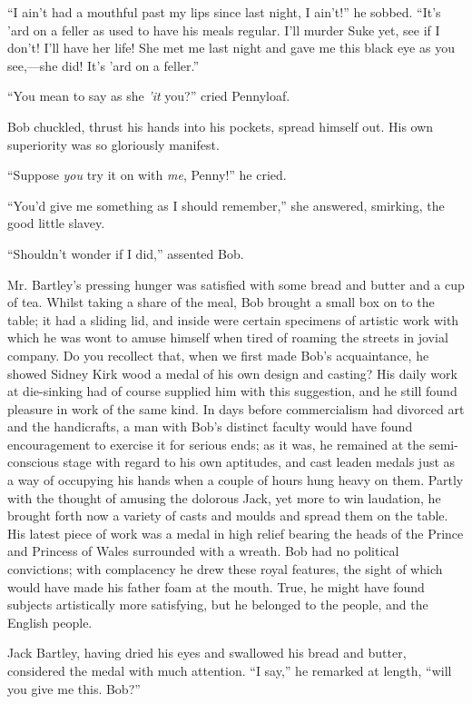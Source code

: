 ``I ain't had a mouthful past my lips since last night, I ain't!'' he
sobbed. ``It's 'ard on a feller as used to have his meals regular. I'll
murder Suke yet, see if I don't! I'll have her life! She met me last
night and gave me this black eye as you see,---she did! It's 'ard on a
feller.''

``You mean to say as she \emph{'it} you?'' cried Pennyloaf.

Bob chuckled, thrust his hands into his pockets, spread himself out. His
own superiority was so gloriously manifest.

``Suppose \emph{you} try it on with \emph{me}, Penny!'' he cried.

``You'd give me something as I should remember,'' she answered,
smirking, the good little slavey.

{\protect\hypertarget{228}{}{}}``Shouldn't wonder if I did,'' assented
Bob.

Mr. Bartley's pressing hunger was satisfied with some bread and butter
and a cup of tea. Whilst taking a share of the meal, Bob brought a small
box on to the table; it had a sliding lid, and inside were certain
specimens of artistic work with which he was wont to amuse himself when
tired of roaming the streets in jovial company. Do you recollect that,
when we first made Bob's acquaintance, he showed Sidney Kirk wood a
medal of his own design and casting? His daily work at die-sinking had
of course supplied him with this suggestion, and he still found pleasure
in work of the same kind. In days before commercialism had divorced art
and the handicrafts, a man with Bob's distinct faculty would have found
encouragement to exercise it for serious ends; as it was, he remained at
the semi-conscious stage with regard to his own aptitudes, and cast
leaden medals just as a way of occupying his hands when a couple of
hours hung heavy on them. Partly with the thought of amusing the
dolorous Jack, yet more to win {\protect\hypertarget{229}{}{}}laudation,
he brought forth now a variety of casts and moulds and spread them on
the table. His latest piece of work was a medal in high relief bearing
the heads of the Prince and Princess of Wales surrounded with a wreath.
Bob had no political convictions; with complacency he drew these royal
features, the sight of which would have made his father foam at the
mouth. True, he might have found subjects artistically more satisfying,
but he belonged to the people, and the English people.

Jack Bartley, having dried his eyes and swallowed his bread and butter,
considered the medal with much attention. ``I say,'' he remarked at
length, ``will you give me this. Bob?''

